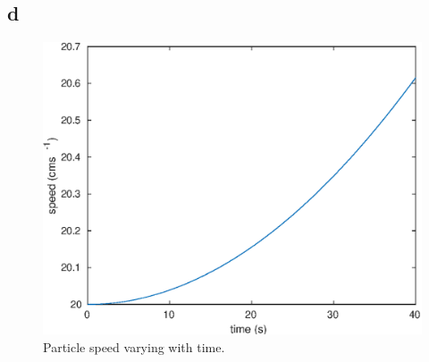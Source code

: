 \subsection{d}
\begin{figure}[h]
    \centering
    \includegraphics[scale=0.7, center]{./eps/topic3_d.eps}
    \caption{Particle speed varying with time.}
    \label{fig:Topic3-d}
\end{figure}

